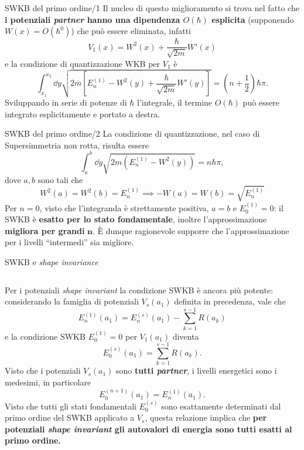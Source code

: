 \documentclass[11pt,aspectratio=169,handout]{beamer}
\begin{document}
\begin{frame}{SWKB del primo ordine/1}
    Il nucleo di questo miglioramento si trova nel fatto che \textbf{i potenziali
    \textit{partner} hanno una dipendenza $O(\hbar)$ esplicita} (supponendo
    $W(x)=O(\hbar^0)$) che può essere eliminata, infatti
    $$
    V_1(x) = W^2(x)+\frac{\hbar}{\sqrt{2m}}W'(x)
    $$
    e la condizione di quantizzazione WKB per $V_1$ è
    $$
    \int_{x_1}^{x_2}\dd y \sqrt{2m\left[E^{(1)}_n-W^2(y)+\frac{\hbar}{\sqrt{2m}}W'(y)
    \right]}
    =\left(n+\frac{1}{2}\right)\hbar\pi.
    $$
    Sviluppando in serie di potenze di $\hbar$ l'integrale, il termine
    $O(\hbar)$ può essere integrato esplicitamente e portato a destra.

\end{frame}
\begin{frame}{SWKB del primo ordine/2}
    La condizione di quantizzazione, nel caso di Supersimmetria non rotta,
    risulta essere
    $$
    \int_{a}^{b} \dd y\sqrt{2m\left(E_n^{(1)}-W^2(y)\right)}=n\hbar\pi,
    $$
    dove $a,b$ sono tali che
    $$
    W^2(a)=W^2(b)=E^{(1)}_n\implies -W(a)=W(b)=\sqrt{E_n^{(1)}}
    $$            
    Per $n=0$, visto che l'integranda è strettamente positiva, $a=b$ e
    $E_0^{(1)}=0$: il SWKB è \textbf{esatto per lo
    stato fondamentale}, inoltre l'approssimazione \textbf{migliora per
    grandi} $\mathbf{n}$. È dunque ragionevole supporre che
    l'approssimazione per i livelli ``intermedi'' sia migliore.
\end{frame}
\begin{frame}{SWKB e \textit{shape invariance}}
    \begin{columns}[t]
        Per i potenziali \textit{shape invariant} la condizione SWKB è ancora
        più potente: considerando la famiglia di potenziali $V_s(a_1)$ definita in
        precedenza, vale che
        \[
            E^{(1)}_n(a_1) = E_n^{(s)}(a_1)-\sum_{k=1}^{s-1}R(a_k)
        \]
        e la condizione SWKB $E_0^{(1)}=0$ per $V_1(a_1)$ diventa
        $$E_0^{(s)}(a_1)=\sum_{k=1}^{s-1}R(a_k).$$
        Visto che i potenziali $V_s(a_1)$ sono \textbf{tutti \textit{partner}},
        i livelli energetici sono i medesimi, in particolare
        $$E_0^{(n+1)}(a_1) = E_n^{(1)}(a_1).$$
        Visto che tutti gli stati fondamentali $E^{(s)}_0$ sono esattamente
        determinati dal primo ordine del SWKB applicato a $V_s$, questa
        relazione implica che \textbf{per potenziali \textit{shape invariant}
        gli autovalori di energia sono tutti esatti al primo ordine.}
    \end{columns}
\end{frame}
\end{document}

